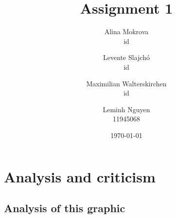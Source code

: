 \documentclass[a4paper]{scrartcl}
\title{Assignment 1}
\author{Alina Mokrova\\
				id
				\and
				Levente	Slajchó\\
				id
				\and
				Maximilian Walterskirchen\\
				id
				\and
				Leminh Nguyen\\
				11945068}
\date{\today}
\begin{document}
\maketitle

\section{Analysis and criticism}



\subsection{Analysis of this graphic}

\end{document}
